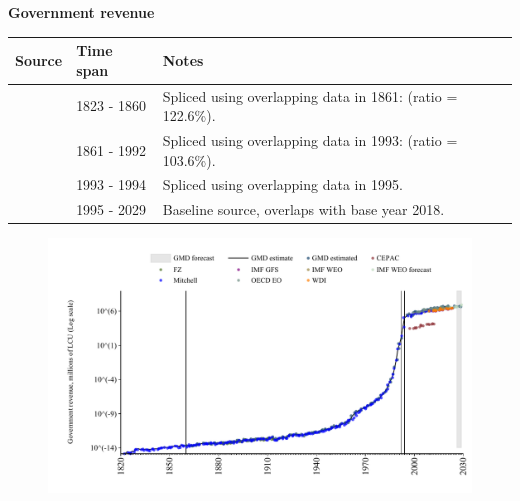\documentclass[12pt,a4paper,landscape]{article}
\begin{document}
\begin{adjustbox}{max totalsize={\paperwidth}{\paperheight},center}
\begin{minipage}[t][\textheight][t]{\textwidth}
\vspace*{0.5cm}
{}
\begin{center}
{\Large\bfseries Government revenue}
\end{center}
\vspace{0.5cm}
\begin{table}[H]
\centering
\small
\begin{tabular}{|l|l|l|}
\hline
\textbf{Source} & \textbf{Time span} & \textbf{Notes} \\
\hline
\rowcolor{white}\cite{Mitchell}& 1823 - 1860 &Spliced using overlapping data in 1861: (ratio = 122.6\%). \\
\rowcolor{lightgray}\cite{GMD_estimated}& 1861 - 1992 &Spliced using overlapping data in 1993: (ratio = 103.6\%). \\
\rowcolor{white}\cite{Mitchell}& 1993 - 1994 &Spliced using overlapping data in 1995. \\
\rowcolor{lightgray}\cite{GMD_estimated}& 1995 - 2029 &Baseline source, overlaps with base year 2018. \\
\hline
\end{tabular}
\end{table}
\begin{figure}[H]
\centering
\includegraphics[width=\textwidth,height=0.6\textheight,keepaspectratio]{graphs/BRA_govrev.pdf}
\end{figure}
\end{minipage}
\end{adjustbox}
\end{document}
